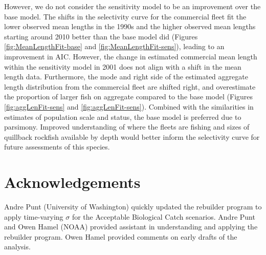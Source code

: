 \documentclass[11pt,
  english,
  a4paper,
]{article}
\begin{document}
\leavevmode\tagmcend\tagstructend\par


However, we do not consider the sensitivity model to be an improvement over the base model. The shifts in the selectivity curve for the commercial fleet fit the lower observed mean lengths in the 1990s and the higher observed mean lengths starting around 2010 better than the base model did (Figures \ref{fig:MeanLengthFit-base} and \ref{fig:MeanLengthFit-sens}), leading to an improvement in AIC. However, the change in estimated commercial mean length within the sensitivity model in 2001 does not align with a shift in the mean length data. Furthermore, the mode and right side of the estimated aggregate length distribution from the commercial fleet are shifted right, and overestimate the proportion of larger fish on aggregate compared to the base model (Figures \ref{fig:aggLenFit-sens} and \ref{fig:aggLenFit-sens}). Combined with the similarities in estimates of population scale and status, the base model is preferred due to parsimony. Improved understanding of where the fleets are fishing and sizes of quillback rockfish available by depth would better inform the selectivity curve for future assessments of this species.

\leavevmode\tagmcend\tagstructend\par


\hypertarget{acknowledgements}{%
\section{Acknowledgements}\label{acknowledgements}}

\leavevmode\tagmcend\tagstructend


Andre Punt (University of Washington) quickly updated the rebuilder program to apply time-varying {\(\sigma\)\leavevmode\tagmcend\tagstructend} for the Acceptable Biological Catch scenarios. Andre Punt and Owen Hamel (NOAA) provided assistant in understanding and applying the rebuilder program. Owen Hamel provided comments on early drafts of the analysis.

\leavevmode\tagmcend\tagstructend\par

\clearpage
\end{document}
